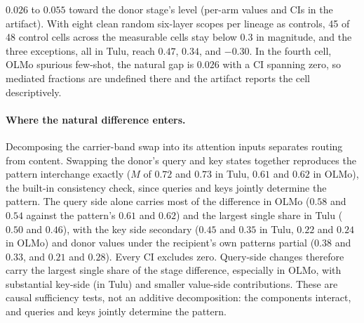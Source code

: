 \documentclass{article}
\begin{document}
$0.026$ to $0.055$ toward the donor stage's level (per-arm values and CIs in the artifact). With eight clean random six-layer scopes per lineage as controls, 45 of 48 control cells across the measurable cells stay below $0.3$ in magnitude, and the three exceptions, all in Tulu, reach $0.47$, $0.34$, and $-0.30$. In the fourth cell, OLMo spurious few-shot, the natural gap is $0.026$ with a CI spanning zero, so mediated fractions are undefined there and the artifact reports the cell descriptively.

\paragraph{Where the natural difference enters.} Decomposing the carrier-band swap into its attention inputs separates routing from content. Swapping the donor's query and key states together reproduces the pattern interchange exactly ($M$ of $0.72$ and $0.73$ in Tulu, $0.61$ and $0.62$ in OLMo), the built-in consistency check, since queries and keys jointly determine the pattern. The query side alone carries most of the difference in OLMo ($0.58$ and $0.54$ against the pattern's $0.61$ and $0.62$) and the largest single share in Tulu ($0.50$ and $0.46$), with the key side secondary ($0.45$ and $0.35$ in Tulu, $0.22$ and $0.24$ in OLMo) and donor values under the recipient's own patterns partial ($0.38$ and $0.33$, and $0.21$ and $0.28$). Every CI excludes zero. Query-side changes therefore carry the largest single share of the stage difference, especially in OLMo, with substantial key-side (in Tulu) and smaller value-side contributions. These are causal sufficiency tests, not an additive decomposition: the components interact, and queries and keys jointly determine the pattern.
\end{document}
